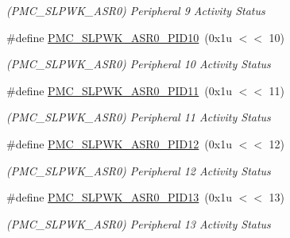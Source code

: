 \begin{DoxyCompactItemize}
\begin{DoxyCompactList}\small\item\em (P\+M\+C\+\_\+\+S\+L\+P\+W\+K\+\_\+\+A\+S\+R0) Peripheral 9 Activity Status \end{DoxyCompactList}\item 
\mbox{\label{group__SAME70__PMC_ga1cf698e56267c5e9ff42dbf6981ed7db}} 
\#define \mbox{\hyperlink{group__SAME70__PMC_ga1cf698e56267c5e9ff42dbf6981ed7db}{P\+M\+C\+\_\+\+S\+L\+P\+W\+K\+\_\+\+A\+S\+R0\+\_\+\+P\+I\+D10}}~(0x1u $<$$<$ 10)
\begin{DoxyCompactList}\small\item\em (P\+M\+C\+\_\+\+S\+L\+P\+W\+K\+\_\+\+A\+S\+R0) Peripheral 10 Activity Status \end{DoxyCompactList}\item 
\mbox{\label{group__SAME70__PMC_ga3b1e8f4286a4b59be3dfd1fc943ba8bc}} 
\#define \mbox{\hyperlink{group__SAME70__PMC_ga3b1e8f4286a4b59be3dfd1fc943ba8bc}{P\+M\+C\+\_\+\+S\+L\+P\+W\+K\+\_\+\+A\+S\+R0\+\_\+\+P\+I\+D11}}~(0x1u $<$$<$ 11)
\begin{DoxyCompactList}\small\item\em (P\+M\+C\+\_\+\+S\+L\+P\+W\+K\+\_\+\+A\+S\+R0) Peripheral 11 Activity Status \end{DoxyCompactList}\item 
\mbox{\label{group__SAME70__PMC_gaedffc46071d316bb36e854eff5d0156e}} 
\#define \mbox{\hyperlink{group__SAME70__PMC_gaedffc46071d316bb36e854eff5d0156e}{P\+M\+C\+\_\+\+S\+L\+P\+W\+K\+\_\+\+A\+S\+R0\+\_\+\+P\+I\+D12}}~(0x1u $<$$<$ 12)
\begin{DoxyCompactList}\small\item\em (P\+M\+C\+\_\+\+S\+L\+P\+W\+K\+\_\+\+A\+S\+R0) Peripheral 12 Activity Status \end{DoxyCompactList}\item 
\mbox{\label{group__SAME70__PMC_ga682c66ee149768ea3d0d7e5d2865b39a}} 
\#define \mbox{\hyperlink{group__SAME70__PMC_ga682c66ee149768ea3d0d7e5d2865b39a}{P\+M\+C\+\_\+\+S\+L\+P\+W\+K\+\_\+\+A\+S\+R0\+\_\+\+P\+I\+D13}}~(0x1u $<$$<$ 13)
\begin{DoxyCompactList}\small\item\em (P\+M\+C\+\_\+\+S\+L\+P\+W\+K\+\_\+\+A\+S\+R0) Peripheral 13 Activity Status \end{DoxyCompactList}\item 

\end{DoxyCompactItemize}
